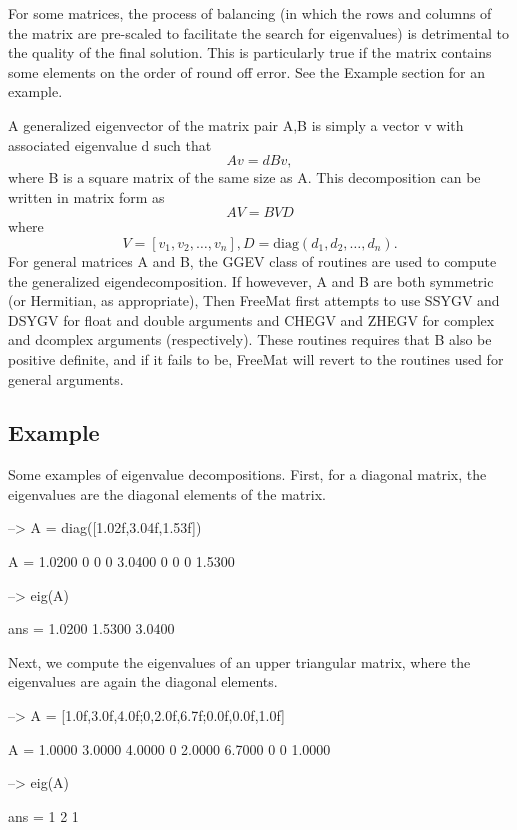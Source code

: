 For some matrices, the process of balancing (in which the rows and columns of the matrix are pre-\/scaled to facilitate the search for eigenvalues) is detrimental to the quality of the final solution. This is particularly true if the matrix contains some elements on the order of round off error. See the Example section for an example.

A generalized eigenvector of the matrix pair {\ttfamily A,B} is simply a vector {\ttfamily v} with associated eigenvalue {\ttfamily d} such that \[ A v = d B v, \] where {\ttfamily B} is a square matrix of the same size as {\ttfamily A}. This decomposition can be written in matrix form as \[ A V = B V D \] where \[ V = [v_1,v_2,\ldots,v_n], D = \mathrm{diag}(d_1,d_2,\ldots,d_n). \] For general matrices {\ttfamily A} and {\ttfamily B}, the {\ttfamily G\-G\-E\-V} class of routines are used to compute the generalized eigendecomposition. If howevever, {\ttfamily A} and {\ttfamily B} are both symmetric (or Hermitian, as appropriate), Then Free\-Mat first attempts to use {\ttfamily S\-S\-Y\-G\-V} and {\ttfamily D\-S\-Y\-G\-V} for {\ttfamily float} and {\ttfamily double} arguments and {\ttfamily C\-H\-E\-G\-V} and {\ttfamily Z\-H\-E\-G\-V} for {\ttfamily complex} and {\ttfamily dcomplex} arguments (respectively). These routines requires that {\ttfamily B} also be positive definite, and if it fails to be, Free\-Mat will revert to the routines used for general arguments. \hypertarget{variables_struct_Example}{}\subsection{Example}\label{variables_struct_Example}
Some examples of eigenvalue decompositions. First, for a diagonal matrix, the eigenvalues are the diagonal elements of the matrix.


\begin{DoxyVerbInclude}
--> A = diag([1.02f,3.04f,1.53f])

A = 
    1.0200         0         0 
         0    3.0400         0 
         0         0    1.5300 

--> eig(A)

ans = 
    1.0200 
    1.5300 
    3.0400 
\end{DoxyVerbInclude}


Next, we compute the eigenvalues of an upper triangular matrix, where the eigenvalues are again the diagonal elements.


\begin{DoxyVerbInclude}
--> A = [1.0f,3.0f,4.0f;0,2.0f,6.7f;0.0f,0.0f,1.0f]

A = 
    1.0000    3.0000    4.0000 
         0    2.0000    6.7000 
         0         0    1.0000 

--> eig(A)

ans = 
 1 
 2 
 1 
\end{DoxyVerbInclude}


